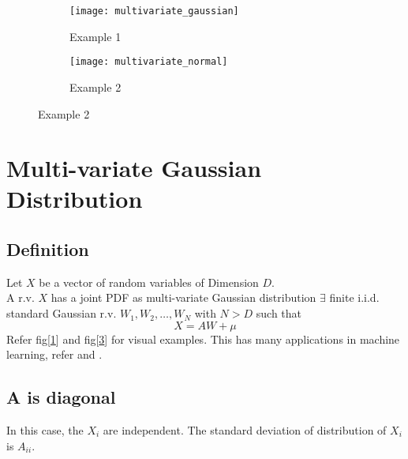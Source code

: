 \documentclass{article}
\begin{document}
\begin{figure}[h!]
     \centering
     \begin{subfigure}{0.49\textwidth}
         \centering
         \texttt{[image: multivariate\_gaussian]}
         \caption{Example 1}
         \label{fig:ex_1}
     \end{subfigure}
     \hfill
     \begin{subfigure}{0.49\textwidth}
         \centering
         \texttt{[image: multivariate\_normal]}
         \caption{Example 2}
         \label{fig:ex_2}
     \end{subfigure}
     \hfill
\end{figure}

\section{Multi-variate Gaussian Distribution}
\subsection{Definition}
Let $X$ be a vector of random variables of Dimension $D$.\\
A r.v. $X$ has a joint PDF as multi-variate Gaussian distribution $\exists$ finite i.i.d. standard Gaussian r.v. $W_1, W_2,\dots,W_N$ with $N > D$ such that\\
\[
    X = AW + \mu
\]
Refer fig[\ref{fig:ex_1}] and fig[\ref{fig:ex_2}] for visual examples. This has many applications in machine learning, refer \cite{book:carl_edward} and \cite{url:gaussian_processes}.

\subsection{A is diagonal}
In this case, the $X_i$ are independent. The standard deviation of distribution of $X_i$ is $A_{ii}$.
\end{document}
